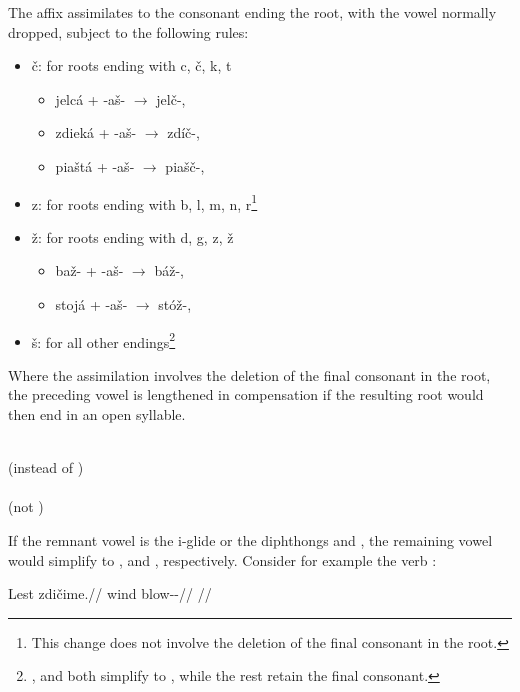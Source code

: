 The affix  assimilates to the consonant ending the root, with the vowel  normally dropped, subject to the following rules:
\begin{itemize}
	\item č: for roots ending with c, č, k, t
	\begin{itemize}
		\item jelcá + -aš- $\rightarrow$ jelč-, 
		\item zdieká + -aš- $\rightarrow$ zdíč-, 
		\item piaštá + -aš- $\rightarrow$ piašč-, 
	\end{itemize}
	\item z: for roots ending with b, l, m, n, r\footnote{This change does not involve the deletion of the final consonant in the root.}
	\item ž: for roots ending with d, g, z, ž
	\begin{itemize}
		\item baž- + -aš- $\rightarrow$ báž-, 
		\item stojá + -aš- $\rightarrow$ stóž-, 
	\end{itemize}
	\item š: for all other endings\footnote{ ,  and  both simplify to , while the rest retain the final consonant.}
\end{itemize}

Where the assimilation involves the deletion of the final consonant in the root, the preceding vowel is lengthened in compensation if the resulting root would then end in an open syllable.
\begin{multicols}{2}
\pex
{}\\
(instead of )\\
\xe
\pex
{}\\
(not )\\
\xe
\end{multicols}

If the remnant vowel is the i-glide  or the diphthongs  and , the remaining vowel would simplify to ,  and , respectively. Consider for example the verb  :

\pex
\begingl
\gla Lest zdičime.//
\glb wind blow-\Av{}-\Prog{}//
\glft {}//
\endgl
\xe

